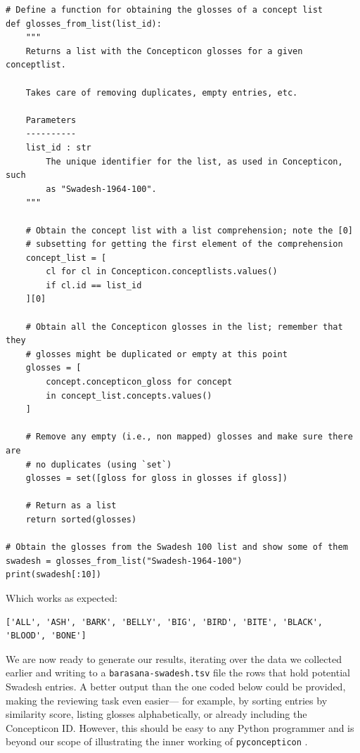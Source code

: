 \documentclass[
  a4paper,
  14pt,
  oneside,
  tablecaptionabove
]{scrbook}
\newcommand{\passthrough}[1]{#1}
\begin{document}
\begin{lstlisting}
# Define a function for obtaining the glosses of a concept list
def glosses_from_list(list_id):
    """
    Returns a list with the Concepticon glosses for a given conceptlist.

    Takes care of removing duplicates, empty entries, etc.

    Parameters
    ----------
    list_id : str
        The unique identifier for the list, as used in Concepticon, such
        as "Swadesh-1964-100".
    """

    # Obtain the concept list with a list comprehension; note the [0]
    # subsetting for getting the first element of the comprehension
    concept_list = [
        cl for cl in Concepticon.conceptlists.values()
        if cl.id == list_id
    ][0]

    # Obtain all the Concepticon glosses in the list; remember that they
    # glosses might be duplicated or empty at this point
    glosses = [
        concept.concepticon_gloss for concept
        in concept_list.concepts.values()
    ]

    # Remove any empty (i.e., non mapped) glosses and make sure there are
    # no duplicates (using `set`)
    glosses = set([gloss for gloss in glosses if gloss])

    # Return as a list
    return sorted(glosses)

# Obtain the glosses from the Swadesh 100 list and show some of them
swadesh = glosses_from_list("Swadesh-1964-100")
print(swadesh[:10])
\end{lstlisting}

Which works as expected:

\begin{lstlisting}
['ALL', 'ASH', 'BARK', 'BELLY', 'BIG', 'BIRD', 'BITE', 'BLACK', 'BLOOD', 'BONE']
\end{lstlisting}

We are now ready to generate our results, iterating over the data we
collected earlier and writing to a
\passthrough{\lstinline!barasana-swadesh.tsv!} file the rows that hold
potential Swadesh entries. A better output than the one coded below
could be provided, making the reviewing task even easier--- for example,
by sorting entries by similarity score, listing glosses alphabetically,
or already including the Concepticon ID. However, this should be easy to
any Python programmer and is beyond our scope of illustrating the inner
working of \passthrough{\lstinline!pyconcepticon!} .
\end{document}
